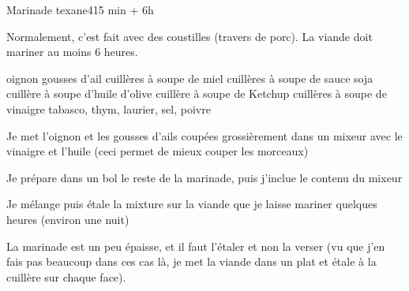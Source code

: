 \begin{recette}{Marinade texane}{4}{15 min + 6h}{}
\begin{remarque}
Normalement, c'est fait avec des coustilles (travers de porc). La viande doit mariner au moins 6 heures.
\end{remarque}
\begin{ingredients}
 oignon
 gousses d'ail
 cuillères à soupe de miel
 cuillères à soupe de sauce soja
 cuillère à soupe d'huile d'olive
 cuillère à soupe de Ketchup
 cuillères à soupe de vinaigre
\ingredient tabasco, thym, laurier, sel, poivre
\end{ingredients}

\begin{preparation}
\item Je met l'oignon et les gousses d'ails coupées grossièrement dans un mixeur avec le vinaigre et l'huile (ceci permet de mieux couper les morceaux)
\item Je prépare dans un bol le reste de la marinade, puis j'inclue le contenu du mixeur
\item Je mélange puis étale la mixture sur la viande que je laisse mariner quelques heures (environ une nuit)
\end{preparation}

\begin{remarque}
La marinade est un peu épaisse, et il faut l'étaler et non la verser (vu que j'en fais pas beaucoup dans ces cas là, je met la viande dans un plat et étale à la cuillère sur chaque face).
\end{remarque}
\end{recette}
